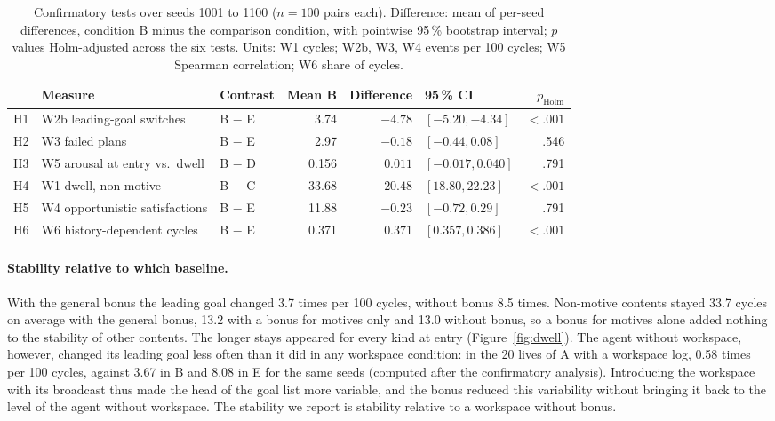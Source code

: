 \documentclass[11pt,a4paper]{article}
\begin{document}
\begin{table}[t]
\centering
\caption{Confirmatory tests over seeds 1001 to 1100 ($n = 100$ pairs each). Difference: mean of per-seed differences, condition B minus the comparison condition, with pointwise 95\,\% bootstrap interval; $p$ values Holm-adjusted across the six tests. Units: W1 cycles; W2b, W3, W4 events per 100 cycles; W5 Spearman correlation; W6 share of cycles.}
\label{tab:hyp}
\footnotesize
\begin{tabularx}{\textwidth}{l Y l r r l r}
\toprule
 & Measure & Contrast & Mean B & Difference & 95\,\% CI & $p_{\mathrm{Holm}}$ \\
\midrule
H1 & W2b leading-goal switches & B $-$ E & 3.74 & $-4.78$ & $[-5.20, -4.34]$ & $<.001$ \\
H2 & W3 failed plans & B $-$ E & 2.97 & $-0.18$ & $[-0.44, 0.08]$ & .546 \\
H3 & W5 arousal at entry vs.\ dwell & B $-$ D & 0.156 & $0.011$ & $[-0.017, 0.040]$ & .791 \\
H4 & W1 dwell, non-motive & B $-$ C & 33.68 & $20.48$ & $[18.80, 22.23]$ & $<.001$ \\
H5 & W4 opportunistic satisfactions & B $-$ E & 11.88 & $-0.23$ & $[-0.72, 0.29]$ & .791 \\
H6 & W6 history-dependent cycles & B $-$ E & 0.371 & $0.371$ & $[0.357, 0.386]$ & $<.001$ \\
\bottomrule
\end{tabularx}
\end{table}

\paragraph{Stability relative to which baseline.} With the general bonus the leading goal changed 3.7 times per 100 cycles, without bonus 8.5 times. Non-motive contents stayed 33.7 cycles on average with the general bonus, 13.2 with a bonus for motives only and 13.0 without bonus, so a bonus for motives alone added nothing to the stability of other contents. The longer stays appeared for every kind at entry (Figure~\ref{fig:dwell}). The agent without workspace, however, changed its leading goal less often than it did in any workspace condition: in the 20 lives of A with a workspace log, 0.58 times per 100 cycles, against 3.67 in B and 8.08 in E for the same seeds (computed after the confirmatory analysis). Introducing the workspace with its broadcast thus made the head of the goal list more variable, and the bonus reduced this variability without bringing it back to the level of the agent without workspace. The stability we report is stability relative to a workspace without bonus.
\end{document}
